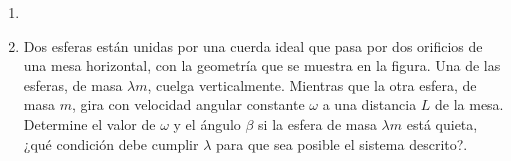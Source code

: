\documentclass[letterpaper,11pt]{article}
\begin{document}
\vspace{-1cm}
\begin{enumerate}\setlength{\itemsep}{0.4cm}


\item[]

\item Dos esferas están unidas por una cuerda ideal que pasa por dos orificios de una mesa horizontal, con la geometría que se muestra en la figura. Una de las esferas, de masa $\lambda m$, cuelga verticalmente. Mientras que la otra esfera, de masa $m$, gira con velocidad angular constante $\omega$ a una distancia $L$ de la mesa. Determine el valor de $\omega$ y el ángulo $\beta$ si la esfera de masa $\lambda m$ está quieta, ¿qué condición debe cumplir $\lambda$ para que sea posible el sistema descrito?.

\begin{figure}[H]
    \centering
    
\end{figure}



        
    
%     



\end{enumerate}
\end{document}
